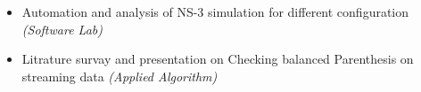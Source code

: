 \\[-1cm]\\
\begin{itemize}
	\item Automation and analysis of NS-3 simulation for different configuration \hfill \emph{(Software Lab)}\\[-0.5cm]
	\item Litrature survay and presentation on Checking balanced Parenthesis on streaming data \hfill \emph{(Applied Algorithm)} \\[-0.5cm]
\end{itemize}
